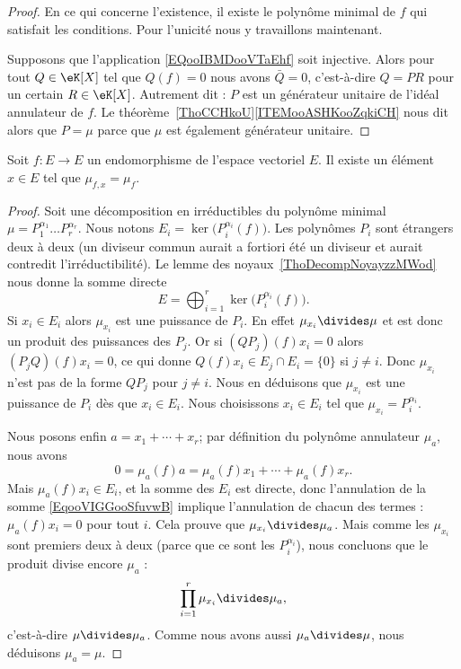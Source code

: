 \begin{proof}
    En ce qui concerne l'existence, il existe le polynôme minimal de \( f\) qui satisfait les conditions. Pour l'unicité nous y travaillons maintenant.

    Supposons que l'application \eqref{EQooIBMDooVTaEhf} soit injective. Alors pour tout \( Q\in \eK[X]\) tel que \( Q(f)=0\) nous avons \( \bar Q=0\), c'est-à-dire \( Q=PR\) pour un certain \( R\in \eK[X]\). Autrement dit : \( P\) est un générateur unitaire de l'idéal annulateur de \( f\). Le théorème~\ref{ThoCCHkoU}\ref{ITEMooASHKooZqkiCH} nous dit alors que \( P=\mu\) parce que \( \mu\) est également générateur unitaire.
\end{proof}

\begin{lemma}\label{LemSYsJJj}
    Soit \( f\colon E\to E\) un endomorphisme de l'espace vectoriel \( E\). Il existe un élément \( x\in E\) tel que \( \mu_{f,x}=\mu_f\).
\end{lemma}

\begin{proof}
    Soit une décomposition en irréductibles du polynôme minimal \( \mu=P_1^{\alpha_1}\ldots P_r^{\alpha_r}\). Nous notons \( E_i=\ker\big( P_i^{\alpha_i}(f) \big)\). Les polynômes \( P_i\) sont étrangers deux à deux (un diviseur commun aurait a fortiori été un diviseur et aurait contredit l'irréductibilité). Le lemme des noyaux~\ref{ThoDecompNoyayzzMWod} nous donne la somme directe
    \begin{equation}
        E=\bigoplus_{i=1}^r\ker\big( P_i^{\alpha_i}(f) \big).
    \end{equation}
    Si \( x_i\in E_i\) alors \( \mu_{x_i}\) est une puissance de \( P_i\). En effet \( \mu_{x_i}\divides \mu\) et est donc un produit des puissances des \( P_j\). Or si \( (QP_j)(f)x_i=0\) alors \( (P_jQ)(f)x_i=0\), ce qui donne \( Q(f)x_i\in E_j\cap E_i=\{ 0 \}\) si \( j\neq i\). Donc \( \mu_{x_i}\) n'est pas de la forme \( QP_j\) pour \( j\neq i\). Nous en déduisons que \( \mu_{x_i}\) est une puissance de \( P_i\) dès que \( x_i\in E_i\). Nous choisissons \( x_i\in E_i\) tel que \( \mu_{x_i}=P_i^{\alpha_i}\).

    Nous posons enfin \( a=x_1+\cdots +x_r\); par définition du polynôme annulateur \( \mu_a\), nous avons
    \begin{equation}        \label{EqooVIGGooSfuvwB}
        0=\mu_a(f)a=\mu_a(f)x_1+\cdots +\mu_a(f)x_r.
    \end{equation}
    Mais \( \mu_a(f)x_i\in E_i\), et la somme des \( E_i\) est directe, donc l'annulation de la somme \eqref{EqooVIGGooSfuvwB} implique l'annulation de chacun des termes : \( \mu_a(f)x_i=0\) pour tout \( i\). Cela prouve que \( \mu_{x_i}\divides \mu_a\). Mais comme les \( \mu_{x_i}\) sont premiers deux à deux (parce que ce sont les \( P_i^{\alpha_i}\)), nous concluons que le produit divise encore \( \mu_a\) :
    \begin{equation}
        \prod_{i=1}^r\mu_{x_i}\divides \mu_a,
    \end{equation}
    c'est-à-dire \( \mu\divides \mu_a\). Comme nous avons aussi \( \mu_a\divides \mu\), nous déduisons \( \mu_a=\mu\).
\end{proof}

